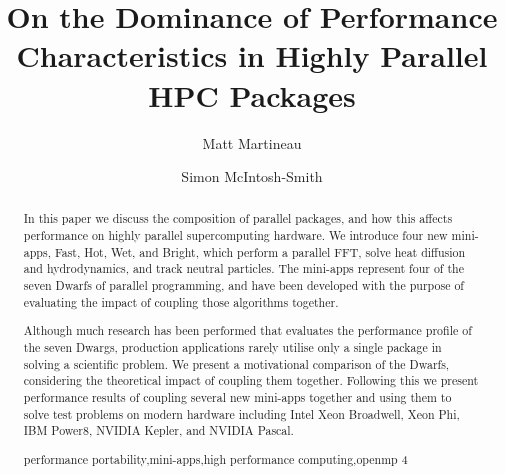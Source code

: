 \documentclass[runningheads,a4paper]{llncs}
\newcommand{\keywords}[1]{\par\addvspace\baselineskip
\noindent\keywordname\enspace\ignorespaces#1}
\begin{document}
\mainmatter  %

\title{On the Dominance of Performance Characteristics in Highly Parallel HPC Packages}


\author{Matt Martineau \and Simon McIntosh-Smith}
%


%
%

\maketitle


\begin{abstract}
  In this paper we discuss the composition of parallel packages, and how this affects performance on highly parallel supercomputing hardware. We introduce four new mini-apps, Fast, Hot, Wet, and Bright, which perform a parallel FFT, solve heat diffusion and hydrodynamics, and track neutral particles. The mini-apps represent four of the seven Dwarfs of parallel programming, and have been developed with the purpose of evaluating the impact of coupling those algorithms together.

  Although much research has been performed that evaluates the performance profile of the seven Dwargs, production applications rarely utilise only a single package in solving a scientific problem. We present a motivational comparison of the Dwarfs, considering the theoretical impact of coupling them together. Following this we present performance results of coupling several new mini-apps together and using them to solve test problems on modern hardware including Intel Xeon Broadwell, Xeon Phi, IBM Power8, NVIDIA Kepler, and NVIDIA Pascal.

\keywords{performance portability,mini-apps,high performance computing,openmp 4}
\end{abstract}
\end{document}
